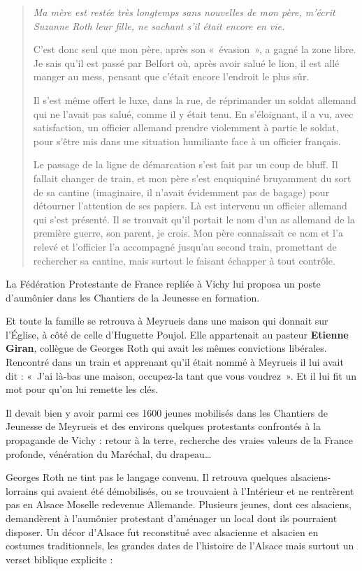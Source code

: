 \begin{quote}\itshape
Ma mère est restée très longtemps sans nouvelles de mon père, m’écrit Suzanne Roth leur
fille, ne sachant s’il était encore en vie.

C’est donc seul que mon père, après son «~évasion~», a gagné la zone libre. Je sais qu’il est
passé par Belfort où, après avoir salué le lion, il est allé manger au mess, pensant que c’était
encore l’endroit le plus sûr.

Il s’est même offert le luxe, dans la rue, de réprimander un soldat allemand qui ne l’avait pas
salué, comme il y était tenu. En s’éloignant, il a vu, avec satisfaction, un officier allemand
prendre violemment à partie le soldat, pour s’être mis dans une situation humiliante face à un
officier français.

Le passage de la ligne de démarcation s’est fait par un coup de bluff. Il fallait changer de
train, et mon père s’est enquiquiné bruyamment du sort de sa cantine (imaginaire, il n’avait
évidemment pas de bagage) pour détourner l’attention de ses papiers. Là est intervenu un
officier allemand qui s’est présenté. Il se trouvait qu’il portait le nom d’un as allemand de la
première guerre, son parent, je crois. Mon père connaissait ce nom et l’a relevé et l’officier
l’a accompagné jusqu’au second train, promettant de rechercher sa cantine, mais surtout le
faisant échapper à tout contrôle.
\end{quote}

La Fédération Protestante de France repliée à Vichy lui proposa un poste d’aumônier dans les
Chantiers de la Jeunesse en formation.


Et toute la famille se retrouva à Meyrueis dans une maison qui donnait sur l’Église, à côté de
celle d’Huguette Poujol. Elle appartenait au pasteur \textbf{Etienne Giran}, collègue de Georges
Roth qui avait les mêmes convictions libérales. Rencontré dans un train et apprenant qu’il
était nommé à Meyrueis il lui avait dit :
«~J’ai là-bas une maison, occupez-la tant que vous voudrez~». Et il lui fit un mot pour qu’on
lui remette les clés.

Il devait bien y avoir parmi ces 1600 jeunes mobilisés dans les Chantiers de Jeunesse de
Meyrueis et des environs quelques protestants confrontés à la propagande de Vichy : retour à
la terre, recherche des vraies valeurs de la France profonde, vénération du Maréchal, du
drapeau…

Georges Roth ne tint pas le langage convenu.
Il retrouva quelques alsaciens-lorrains qui avaient été démobilisés, ou se trouvaient à
l’Intérieur et ne rentrèrent pas en Alsace Moselle redevenue Allemande. Plusieurs jeunes,
dont ces alsaciens, demandèrent à l’aumônier protestant d’aménager un local dont ils
pourraient disposer. Un décor d’Alsace fut reconstitué avec alsacienne et alsacien en costumes
traditionnels, les grandes dates de l’histoire de l’Alsace mais surtout un verset biblique
explicite :\\

